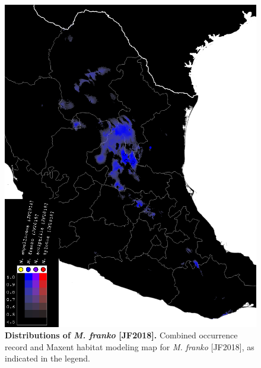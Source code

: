 \documentclass[fleqn,10pt,lineno]{wlpeerj} %
\begin{document}
\begin{figure}[h]
	\centering
	\includegraphics[width=\textwidth]{franko.png}
	\caption{\textbf{Distributions of \textit{M. franko} [JF2018].} Combined occurrence record and Maxent habitat modeling map for \textit{M. franko} [JF2018], as indicated in the legend.}
	\label{fig:map_franko}
\end{figure}
\end{document}
